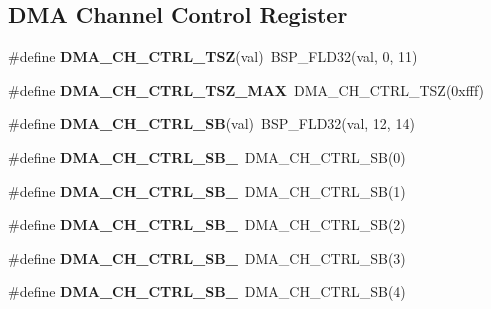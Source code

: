 \subsection*{D\+MA Channel Control Register}
\begin{DoxyCompactItemize}
\item 
\mbox{\label{group__lpc__dma_ga67fc9962a48da2ae31410b703ac5abb5}} 
\#define {\bfseries D\+M\+A\+\_\+\+C\+H\+\_\+\+C\+T\+R\+L\+\_\+\+T\+SZ}(val)~B\+S\+P\+\_\+\+F\+L\+D32(val, 0, 11)
\item 
\mbox{\label{group__lpc__dma_ga0f7546b5190c9ca70df5848ba6d79a29}} 
\#define {\bfseries D\+M\+A\+\_\+\+C\+H\+\_\+\+C\+T\+R\+L\+\_\+\+T\+S\+Z\+\_\+\+M\+AX}~D\+M\+A\+\_\+\+C\+H\+\_\+\+C\+T\+R\+L\+\_\+\+T\+SZ(0xfff)
\item 
\mbox{\label{group__lpc__dma_gac028346a81970e782b4c5746cdc75d71}} 
\#define {\bfseries D\+M\+A\+\_\+\+C\+H\+\_\+\+C\+T\+R\+L\+\_\+\+SB}(val)~B\+S\+P\+\_\+\+F\+L\+D32(val, 12, 14)
\item 
\mbox{\label{group__lpc__dma_gaa1ab0ec898d4d1a9201f214e87c3ae24}} 
\#define {\bfseries D\+M\+A\+\_\+\+C\+H\+\_\+\+C\+T\+R\+L\+\_\+\+S\+B\+\_}~D\+M\+A\+\_\+\+C\+H\+\_\+\+C\+T\+R\+L\+\_\+\+SB(0)
\item 
\mbox{\label{group__lpc__dma_ga5fc0d87f7e82b8f0fb5f1829511d0ee3}} 
\#define {\bfseries D\+M\+A\+\_\+\+C\+H\+\_\+\+C\+T\+R\+L\+\_\+\+S\+B\+\_}~D\+M\+A\+\_\+\+C\+H\+\_\+\+C\+T\+R\+L\+\_\+\+SB(1)
\item 
\mbox{\label{group__lpc__dma_ga1b1921b98cdee461be0342640f352385}} 
\#define {\bfseries D\+M\+A\+\_\+\+C\+H\+\_\+\+C\+T\+R\+L\+\_\+\+S\+B\+\_}~D\+M\+A\+\_\+\+C\+H\+\_\+\+C\+T\+R\+L\+\_\+\+SB(2)
\item 
\mbox{\label{group__lpc__dma_ga688b564bdc195e59a0fcadbdbb51c3ea}} 
\#define {\bfseries D\+M\+A\+\_\+\+C\+H\+\_\+\+C\+T\+R\+L\+\_\+\+S\+B\+\_}~D\+M\+A\+\_\+\+C\+H\+\_\+\+C\+T\+R\+L\+\_\+\+SB(3)
\item 
\mbox{\label{group__lpc__dma_ga8cf78831ef53a61df642cc07dcf41775}} 
\#define {\bfseries D\+M\+A\+\_\+\+C\+H\+\_\+\+C\+T\+R\+L\+\_\+\+S\+B\+\_}~D\+M\+A\+\_\+\+C\+H\+\_\+\+C\+T\+R\+L\+\_\+\+SB(4)

\end{DoxyCompactItemize}
